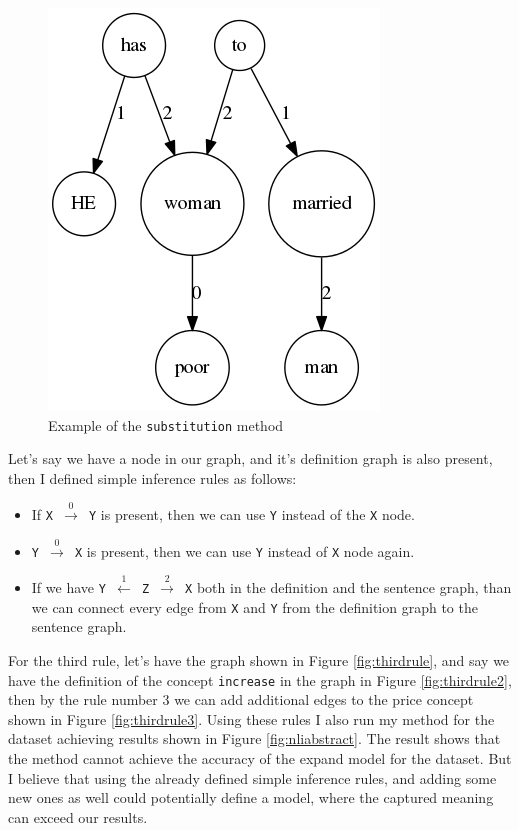 \begin{figure}[h]
	\centering
	\includegraphics[scale=0.4]{figures/mypoorabs}
	\caption{Example of the \texttt{substitution} method}
	\label{fig:mypoorabs}
\end{figure}
Let's say we have a node in our graph, and it's definition graph is also present, then I defined simple inference rules as follows:
\begin{itemize}
	\item If \texttt{X $\xrightarrow0$ Y} is present, then we can use \texttt{Y} instead of the \texttt{X} node.
	\item \texttt{Y $\xrightarrow0$ X} is present, then we can use \texttt{Y} instead of \texttt{X} node again.
	\item If we have \texttt{Y $\xleftarrow1$ Z $\xrightarrow2$ X}  both in the definition and the sentence graph, than we can connect every edge from \texttt{X} and \texttt{Y} from the definition graph to the sentence graph.
\end{itemize}
For the third rule, let's have the graph shown in Figure \ref{fig:thirdrule}, and say we have the definition of the concept \texttt{increase} in the graph in Figure \ref{fig:thirdrule2}, then by the rule number 3 we can add  additional edges to the price concept shown in Figure \ref{fig:thirdrule3}. Using these rules I also run my method for the dataset achieving results shown in Figure \ref{fig:nliabstract}. The result shows that the method cannot achieve the accuracy of the expand model for the dataset. But I believe that using the already defined simple inference rules, and adding some new ones as well could potentially define a model, where the captured meaning can exceed our results.


